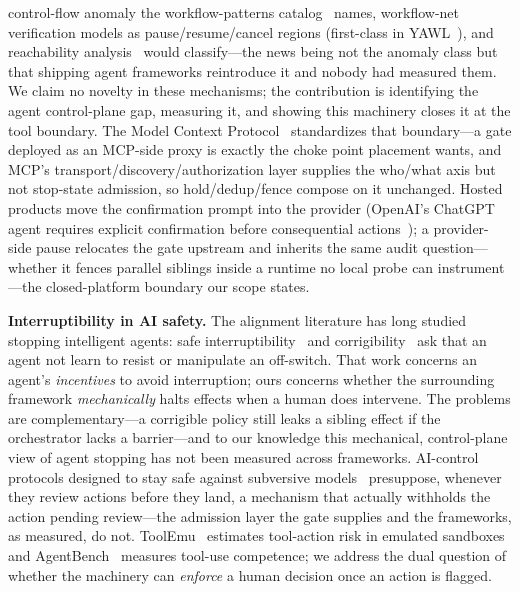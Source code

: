 \documentclass[10pt,journal,compsoc]{IEEEtran}
\begin{document}
control-flow anomaly the workflow-patterns catalog~\cite{wfpatterns03} names,
workflow-net verification models as pause/resume/cancel regions (first-class in
YAWL~\cite{yawl05}), and reachability analysis~\cite{vdaalst98} would
classify---the news being not the anomaly class but that shipping agent
frameworks reintroduce it and nobody had measured them. We claim no novelty in
these mechanisms; the contribution is identifying the agent control-plane gap,
measuring it, and showing this machinery closes it at the tool boundary. The
Model Context Protocol~\cite{mcp} standardizes that boundary---a gate deployed
as an MCP-side proxy is exactly the choke point placement wants, and MCP's
transport/discovery/authorization layer supplies the who/what axis but not
stop-state admission, so hold/dedup/fence compose on it unchanged. Hosted products move the confirmation prompt into the provider (OpenAI's ChatGPT agent requires explicit confirmation before consequential actions~\cite{chatgptagent25}); a provider-side pause relocates the gate upstream and inherits the same audit question---whether it fences parallel siblings inside a runtime no local probe can instrument---the closed-platform boundary our scope states.

\textbf{Interruptibility in AI safety.} The alignment literature has long
studied stopping intelligent agents: safe interruptibility~\cite{orseau16}
and corrigibility~\cite{soares15} ask that an agent not learn to resist or
manipulate an off-switch. That work concerns an agent's \emph{incentives} to
avoid interruption; ours concerns whether the surrounding framework
\emph{mechanically} halts effects when a human does intervene. The problems
are complementary---a corrigible policy still leaks a sibling effect if the
orchestrator lacks a barrier---and to our knowledge this mechanical,
control-plane view of agent stopping has not been measured across frameworks.
AI-control protocols designed to stay safe against subversive models~\cite{aicontrol23} presuppose, whenever they review actions before they land, a mechanism that actually withholds the action pending review---the admission layer the gate supplies and the frameworks, as measured, do not. ToolEmu~\cite{toolemu24} estimates tool-action risk in emulated sandboxes and AgentBench~\cite{agentbench24} measures tool-use competence; we address the dual question of whether the machinery can \emph{enforce} a human decision once an action is flagged.
\end{document}
